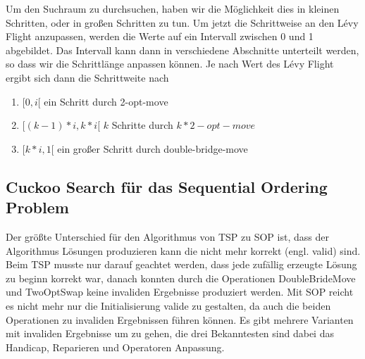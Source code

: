 \documentclass[conference]{IEEEtran}
\begin{document}
      Um den Suchraum zu durchsuchen, haben wir die Möglichkeit dies in kleinen Schritten, 
      oder in großen Schritten zu tun. Um jetzt die Schrittweise an den Lévy Flight anzupassen, 
      werden die Werte auf ein Intervall zwischen 0 und 1 abgebildet. Das Intervall kann dann in 
      verschiedene Abschnitte unterteilt werden, so dass wir die Schrittlänge anpassen können.
      Je nach Wert des Lévy Flight ergibt sich dann die Schrittweite nach
      \begin{enumerate}
        \item$[0,i[$ ein Schritt durch 2-opt-move
        \item$[(k-1)*i, k*i[$ $k$ Schritte durch $k * 2-opt-move$
        \item$[k*i,1[$ ein großer Schritt durch double-bridge-move
      \end{enumerate}


    \label{Implementierung Repair}
    \subsection{Cuckoo Search für das Sequential Ordering Problem}
      Der größte Unterschied für den Algorithmus von TSP zu SOP ist, dass der Algorithmus Lösungen 
      produzieren kann die nicht mehr korrekt (engl. valid) sind. Beim TSP musste nur darauf geachtet werden, 
      dass jede zufällig erzeugte Lösung zu beginn korrekt war, danach konnten durch die Operationen 
      DoubleBrideMove und TwoOptSwap keine invaliden Ergebnisse produziert werden.
      Mit SOP reicht es nicht mehr nur die Initialisierung valide zu gestalten, da auch die 
      beiden Operationen zu invaliden Ergebnissen führen können. 
      Es gibt mehrere Varianten mit invaliden Ergebnisse um zu gehen, die drei Bekanntesten sind 
      dabei das Handicap, Reparieren und Operatoren Anpassung. 
\end{document}
